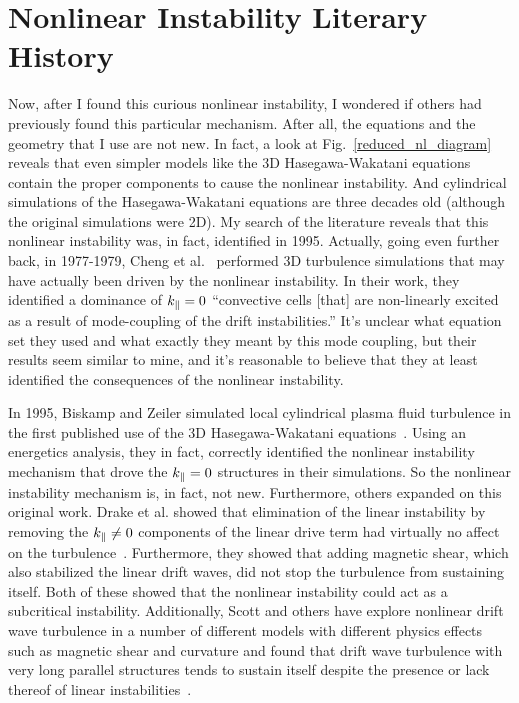 \section{Nonlinear Instability Literary History}
\label{s_nl_inst_context}

Now, after I found this curious nonlinear instability, I wondered if others had previously found this particular mechanism. 
After all, the equations and the geometry that I use are not new. In fact, a look at 
Fig.~\ref{reduced_nl_diagram} reveals that even simpler models like the 3D Hasegawa-Wakatani equations~\cite{hasegawa1983} contain the proper components to cause the nonlinear instability. And 
cylindrical simulations of the Hasegawa-Wakatani equations are three decades old (although the original simulations were 2D).
My search of the literature reveals that this nonlinear instability was, in fact, identified in 1995. Actually, going even further back, in 1977-1979, 
Cheng et al.~\cite{cheng1977,cheng1979} performed 3D turbulence simulations that may have actually been driven by the nonlinear instability. 
In their work, they identified a dominance of $k_\parallel=0$ ``convective cells [that] are non-linearly excited as a result of mode-coupling of the drift instabilities.'' 
It's unclear what equation set they used
and what exactly they meant by this mode coupling, but their results seem similar to mine, and it's reasonable to believe that they at least identified the consequences of the nonlinear instability.

In 1995, Biskamp and Zeiler simulated local cylindrical plasma fluid turbulence in the first published use of the 3D Hasegawa-Wakatani equations~\cite{biskamp1995}. 
Using an energetics analysis, they in fact, correctly identified the nonlinear instability mechanism that drove the $k_\parallel=0$ structures in their simulations. So the nonlinear instability
mechanism is, in fact, not new. Furthermore, others expanded on this original work. 
Drake et al. showed that elimination of the linear instability by removing the $k_\parallel \ne 0$ components of the linear drive term
had virtually no affect on the turbulence~\cite{drake1995}. Furthermore, they showed that adding magnetic shear, which also stabilized the linear drift waves, did not stop the turbulence
from sustaining itself. Both of these showed that the nonlinear instability could act as a subcritical instability.
Additionally, Scott and others have explore nonlinear drift wave turbulence in a number of different models with different physics effects such as magnetic shear and curvature
and found that drift wave turbulence with very long parallel structures tends to sustain itself despite the presence or lack thereof of linear 
instabilities~\cite{scott1990,scott1992,zeiler1996,zeiler1997,korsholm1999,scott2002,scott2003,scott2005}.

